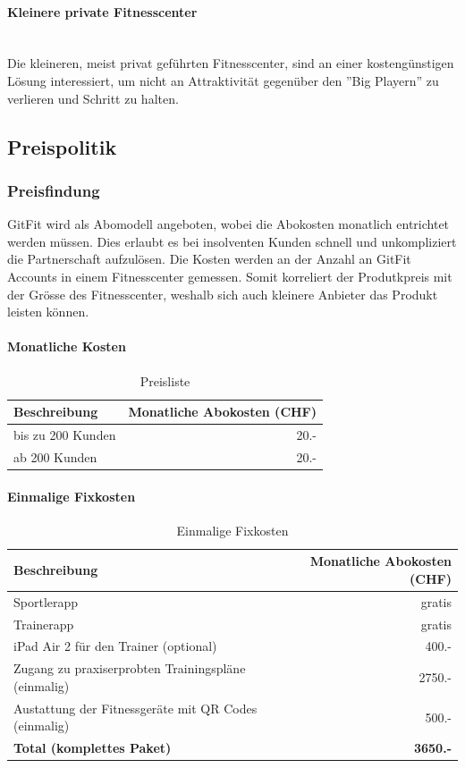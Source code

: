 \paragraph{Kleinere private Fitnesscenter} \hfill \\
Die kleineren, meist privat geführten Fitnesscenter, sind an einer kostengünstigen Lösung interessiert, um nicht an Attraktivität gegenüber den ''Big Playern'' zu verlieren und Schritt zu halten. 


\subsection{Preispolitik}\label{sec:preispolitik}
\subsubsection{Preisfindung}
GitFit wird als Abomodell angeboten, wobei die Abokosten monatlich entrichtet werden müssen. Dies erlaubt es bei insolventen Kunden schnell und unkompliziert die Partnerschaft aufzulösen. Die Kosten werden an der Anzahl an GitFit Accounts in einem Fitnesscenter gemessen. Somit korreliert der Produtkpreis mit der Grösse des Fitnesscenter, weshalb sich auch kleinere Anbieter das Produkt leisten können.

\paragraph{Monatliche Kosten} \hfill
\begin{table}[h]
	\centering
	\begin{tabu} to \linewidth {l r}
		\toprule 
		Beschreibung & Monatliche Abokosten (CHF) \\
		\midrule
		bis zu 200 Kunden & 20.- \\
		ab 200 Kunden & 20.- \\
		\bottomrule 
	\end{tabu} 
	\caption{Preisliste}
\end{table}

\paragraph{Einmalige Fixkosten} \hfill
\begin{table}[h]
	\centering
	\begin{tabu} to \linewidth {l r}
		\toprule 
		Beschreibung & Monatliche Abokosten (CHF) \\
		\midrule
		Sportlerapp & gratis \\
		Trainerapp & gratis \\
		iPad Air 2 für den Trainer (optional) & 400.- \\
		Zugang zu praxiserprobten Trainingspläne (einmalig) & 2750.- \\
		Austattung der Fitnessgeräte mit QR Codes (einmalig) & 500.-  \\
		\midrule
		\textbf{Total (komplettes Paket)} & \textbf{3650.-} \\
		\bottomrule 
	\end{tabu} 
	\caption{Einmalige Fixkosten}
\end{table}


